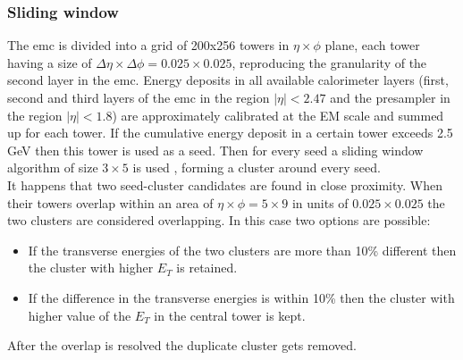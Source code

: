      \subsubsection{Sliding window}
     The \gls{emc} is divided into a grid of 200x256 towers in $\eta \times \phi$ plane, each tower having a size of $\Delta \eta \times \Delta \phi=0.025\times0.025$, reproducing the granularity of the second layer in the \gls{emc}. Energy deposits in all available calorimeter layers (first, second and third layers of the \gls{emc} in the region $|\eta| < 2.47$ and the presampler in the region $|\eta| < 1.8$) are approximately calibrated at the EM scale and summed up for each tower. If the cumulative energy deposit in a certain tower exceeds 2.5 GeV then this tower is used as a seed. Then for every seed a sliding window algorithm of size $3 \times 5$ is used \cite{Lampl:1099735}, forming a cluster around every seed. \\
     It happens that two seed-cluster candidates are found in close proximity. When their towers overlap within an area of $\eta \times \phi=5\times 9$ in units of $0.025\times0.025$ the two clusters are considered overlapping. In this case two options are possible:
      \begin{itemize}
     	\item If the transverse energies of the two clusters are more than 10\% different then the cluster with higher $E_T$ is retained.
     	\item If the difference in the transverse energies is within 10\% then the cluster with higher value of the $E_T$ in the central tower is kept.
     \end{itemize}
 	After the overlap is resolved the duplicate cluster gets removed.\\
